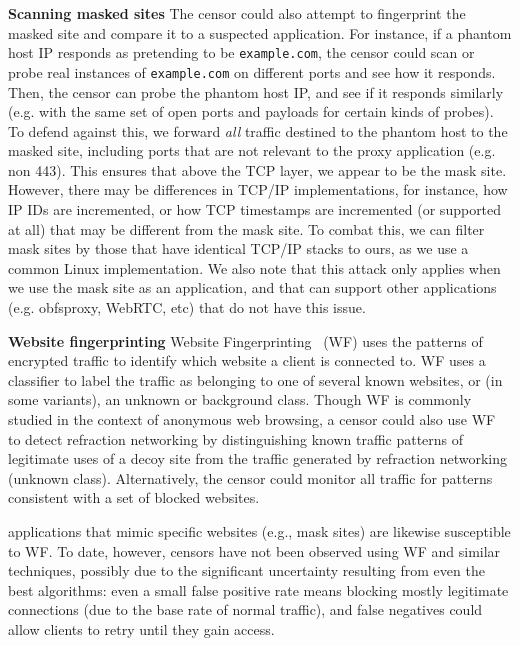 \documentclass[letterpaper,twocolumn,10pt]{article}
\renewcommand{\paragraph}[1]{\smallskip\noindent\textbf{#1\quad}}
\begin{document}
\paragraph{Scanning masked sites}
The censor could also attempt to fingerprint the masked site and compare it to a
suspected \scheme application. For instance, if a phantom host IP responds as
pretending to be \texttt{example.com}, the censor could scan or probe real instances
of \texttt{example.com} on different ports and see how it responds. Then, the
censor can probe the phantom host IP, and see if it responds similarly (e.g. with
the same set of open ports and payloads for certain kinds of probes). To defend
against this, we forward \emph{all} traffic destined to the phantom host to the
masked site, including ports that are not relevant to the proxy application
(e.g. non 443). This ensures that above the TCP layer, we appear to be the mask
site. However, there may be differences in TCP/IP implementations, for instance,
how IP IDs are incremented, or how TCP timestamps are incremented (or supported
at all) that may be different from the mask site. To combat this, we can filter
mask sites by those that have identical TCP/IP stacks to ours, as we use a
common Linux implementation. We also note that this attack only applies when we
use the mask site as an application, and that \scheme can support other
applications (e.g. obfsproxy, WebRTC, etc) that do not have this issue.



\paragraph{Website fingerprinting}
Website Fingerprinting~\cite{wang2014effective,hayes2016k,sirinam2018deep} (WF) uses the patterns of encrypted traffic to identify which website a client is connected to. WF uses a classifier to label the traffic as belonging to one of several known websites, or (in some variants), an unknown or background class. Though WF is commonly studied in the context of anonymous web browsing, a censor could also use WF to detect refraction networking by distinguishing known traffic patterns of legitimate uses of a decoy site from the traffic generated by refraction networking (unknown class). Alternatively, the censor could monitor all traffic for patterns consistent with a set of blocked websites.

\scheme applications that mimic specific websites (e.g., mask sites) are likewise susceptible to WF. To date, however, censors have not been observed using WF and similar techniques, possibly due to the significant uncertainty resulting from even the best algorithms: even a small false
positive rate means blocking mostly legitimate connections (due to the base rate
of normal traffic), and false negatives could allow clients to retry until they
gain access.
\end{document}
